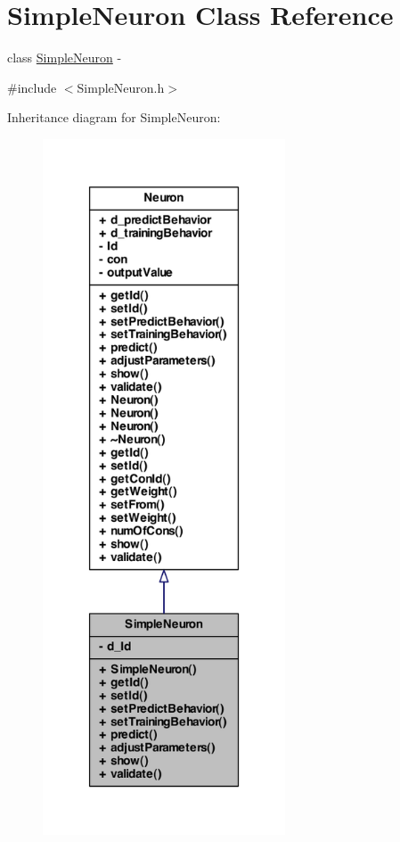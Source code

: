 \hypertarget{class_simple_neuron}{
\section{SimpleNeuron Class Reference}
\label{class_simple_neuron}
}


class \hyperlink{class_simple_neuron}{SimpleNeuron} -\/  




{\ttfamily \#include $<$SimpleNeuron.h$>$}



Inheritance diagram for SimpleNeuron:
\nopagebreak
\begin{figure}[H]
\begin{center}
\leavevmode
\includegraphics[width=204pt]{class_simple_neuron__inherit__graph}
\end{center}
\end{figure}


